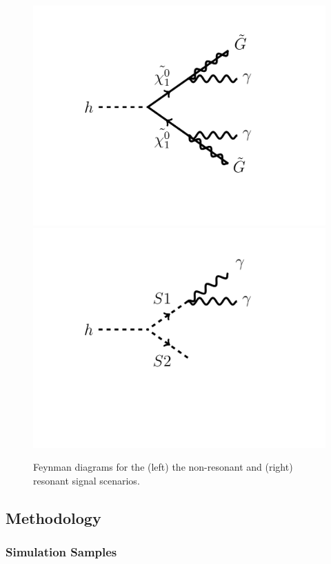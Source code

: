 \begin{figure}[htbp]
\centering
\includegraphics[scale=0.2]{figs/feyn/feyn_nonres.pdf}
\hspace{1cm}
\includegraphics[scale=0.2]{figs/feyn/feyn_res.pdf}
\caption{Feynman diagrams for the (left) the non-resonant and (right) resonant signal scenarios.}
\label{fig:FEYN_SIG}
\end{figure}

\subsection{Methodology}
\subsubsection{Simulation Samples \label{sub:simulation}}

